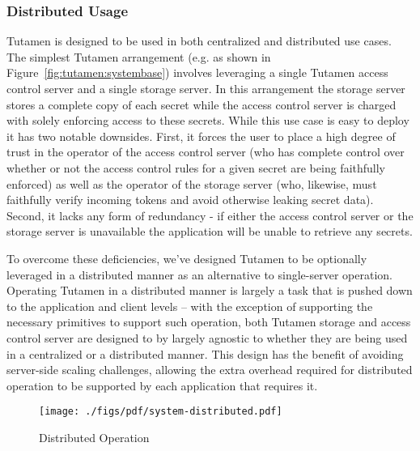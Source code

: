\subsubsection{Distributed Usage}
\label{sec:tutamen:arch:distributed}

Tutamen is designed to be used in both centralized and distributed use
cases. The simplest Tutamen arrangement (e.g. as shown in
Figure~\ref{fig:tutamen:systembase}) involves leveraging a single
Tutamen access control server and a single storage server. In this
arrangement the storage server stores a complete copy of each secret
while the access control server is charged with solely enforcing access
to these secrets. While this use case is easy to deploy it has two
notable downsides. First, it forces the user to place a high degree of
trust in the operator of the access control server (who has complete
control over whether or not the access control rules for a given
secret are being faithfully enforced) as well as the operator of the
storage server (who, likewise, must faithfully verify incoming tokens
and avoid otherwise leaking secret data). Second, it lacks any form of
redundancy - if either the access control server or the storage server
is unavailable the application will be unable to retrieve any secrets.

To overcome these deficiencies, we've designed Tutamen to be
optionally leveraged in a distributed manner as an alternative to
single-server operation. Operating Tutamen in a distributed manner is
largely a task that is pushed down to the application and client
levels -- with the exception of supporting the necessary primitives to
support such operation, both Tutamen storage and access control server
are designed to by largely agnostic to whether they are being used in
a centralized or a distributed manner. This design has the benefit of
avoiding server-side scaling challenges, allowing the extra overhead
required for distributed operation to be supported by each application
that requires it.

\begin{figure}[th]
  \centering
  \texttt{[image: ./figs/pdf/system-distributed.pdf]}
  \caption{Distributed Operation}
  \label{fig:tutamen:systemdistributed}
\end{figure}

